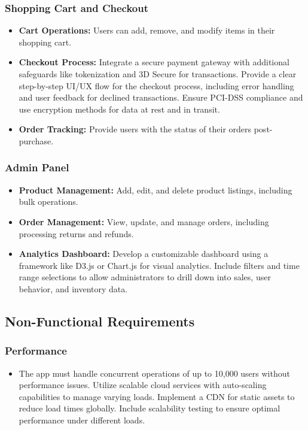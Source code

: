 \documentclass[11pt]{article}
\begin{document}
	\subsubsection*{Shopping Cart and Checkout}
	\begin{itemize}
		\item \textbf{Cart Operations:} Users can add, remove, and modify items in their shopping cart.
		\item \textbf{Checkout Process:} Integrate a secure payment gateway with additional safeguards like tokenization and 3D Secure for transactions. Provide a clear step-by-step UI/UX flow for the checkout process, including error handling and user feedback for declined transactions. Ensure PCI-DSS compliance and use encryption methods for data at rest and in transit.
		\item \textbf{Order Tracking:} Provide users with the status of their orders post-purchase.
	\end{itemize}
	
	\subsubsection*{Admin Panel}
	\begin{itemize}
		\item \textbf{Product Management:} Add, edit, and delete product listings, including bulk operations.
		\item \textbf{Order Management:} View, update, and manage orders, including processing returns and refunds.
		\item \textbf{Analytics Dashboard:} Develop a customizable dashboard using a framework like D3.js or Chart.js for visual analytics. Include filters and time range selections to allow administrators to drill down into sales, user behavior, and inventory data.
	\end{itemize}
	
	\subsection*{Non-Functional Requirements}
	
	\subsubsection*{Performance}
	\begin{itemize}
		\item The app must handle concurrent operations of up to 10,000 users without performance issues. Utilize scalable cloud services with auto-scaling capabilities to manage varying loads. Implement a CDN for static assets to reduce load times globally. Include scalability testing to ensure optimal performance under different loads.
	\end{itemize}
	
\end{document}
